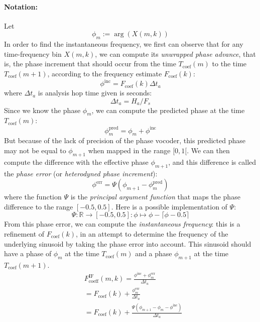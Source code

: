 \documentclass[letterpaper]{article}
\begin{document}
\paragraph{Notation:}
Let \[\phi_m:=\arg(X(m,k))\]
In order to find the instantaneous frequency, we first can observe that for
any time-frequency bin \(X(m,k)\), we can compute its \emph{unwrapped phase advance},
that is, the phase increment that should occur from the time
\(T_{\text{coef}}(m)\) to the time \(T_{\text{coef}}(m+1)\), according to the
frequency estimate \(F_{\text{coef}}(k)\):
\begin{equation}
    \phi^{\text{inc}}=F_{\text{coef}}(k) \Delta t_a
\end{equation}
where \(\Delta t_a\) is analysis hop time given is seconds:
\begin{equation}
    \Delta t_a=H_a/F_s
\end{equation}
Since we know the phase \(\phi_m\), we can compute the predicted phase at
the time \(T_{\text{coef}}(m)\):
\begin{equation}
    \phi^{\text{pred}}_m=\phi_m + \phi^{\text{inc}}
\end{equation}
But because of the lack of precision of the phase vocoder, this predicted phase
may not be equal to \(\phi_{m+1}\) when mapped in the range \([0, 1[\).
We can then compute the difference with the effective phase \(\phi_{m+1}\), and
this difference is called the \emph{phase error} (or \emph{heterodyned phase
increment}):
\begin{equation}
    \phi^{\text{err}}=\Psi(\phi_{m+1} - \phi^{\text{pred}}_m)
\end{equation}
where the function \(\Psi\) is the \emph{principal argument function} that maps
the phase difference to the range \([-0.5, 0.5]\).
Here is a possible implementation of \(\Psi\):
\begin{equation}
    \Psi:\mathbb{R}\to[-0.5,0.5]:\phi\mapsto \phi - \lceil \phi-0.5 \rceil
\end{equation}
From this phase error, we can compute the \emph{instantaneous frequency}: this
is a refinement of \(F_{\text{coef}}(k)\), in an attempt to determine the
frequency of the underlying sinusoid by taking the phase error into account.
This sinusoid should have a phase of
\(\phi_m\) at the time \(T_{\text{coef}}(m)\) and a phase \(\phi_{m+1}\) at
the time \(T_{\text{coef}}(m+1)\).
\begin{align}
    &F_{\text{coeff}}^{\text{IF}}(m,k)=\frac{\phi^{\text{inc}} + \phi^{\text{err}}_m}{\Delta t_a}\\
    &=F_{\text{coef}}(k) + \frac{\phi^{\text{err}}_m}{\Delta t_a}\\
    &=F_{\text{coef}}(k) + \frac{\Psi(\phi_{m+1} - \phi_m - \phi^{\text{inc}})}{\Delta t_a}
\end{align}
\end{document}
